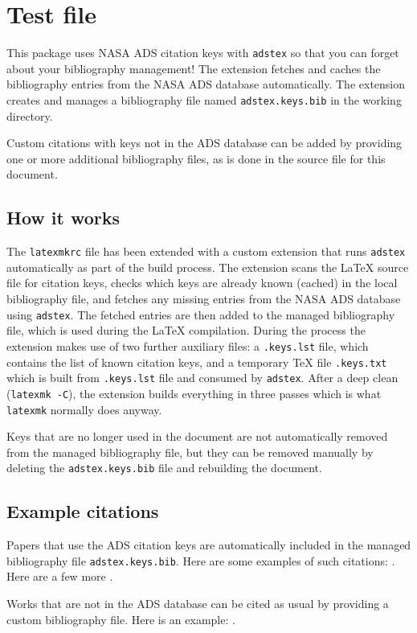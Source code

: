 \documentclass{article}
\begin{document}
\section*{Test file}

This package uses NASA ADS citation keys with \texttt{adstex} so that you can forget about your bibliography management! The extension fetches and caches the bibliography entries from the NASA ADS database automatically. The extension creates and manages a bibliography file named \texttt{adstex.keys.bib} in the working directory. 

Custom citations with keys not in the ADS database can be added by providing one or more additional bibliography files, as is done in the source file for this document.

\subsection*{How it works}
The \texttt{latexmkrc} file has been extended with a custom extension that runs \texttt{adstex} automatically as part of the build process. The extension scans the LaTeX source file for citation keys, checks which keys are already known (cached) in the local bibliography file, and fetches any missing entries from the NASA ADS database using \texttt{adstex}. The fetched entries are then added to the managed bibliography file, which is used during the LaTeX compilation. During the process the extension makes use of two further auxiliary files: a \texttt{.keys.lst} file, which contains the list of known citation keys, and a temporary TeX file \texttt{.keys.txt} which is built from \texttt{.keys.lst} file and consumed by \texttt{adstex}. After a deep clean (\texttt{latexmk -C}), the extension builds everything in three passes which is what \texttt{latexmk} normally does anyway. 

Keys that are no longer used in the document are not automatically removed from the managed bibliography file, but they can be removed manually by deleting the \texttt{adstex.keys.bib} file and rebuilding the document.

\subsection*{Example citations}
Papers that use the ADS citation keys are automatically included in the managed bibliography file \texttt{adstex.keys.bib}.
Here are some examples of such citations:
\cite{%
    1958ZA.....46..108B,%
    1962AJ.....67..471K,%
    1966AJ.....71...64K%
}. 
Here are a few more
\cite{2002Sci...295...82K,2003PASP..115..763C}. 

Works that are not in the ADS database can be cited as usual by providing a custom bibliography file. Here is an example: \cite{mcgrail2004}.




\end{document}
